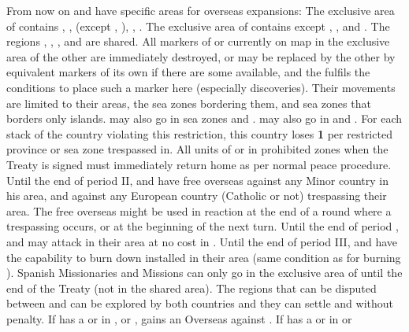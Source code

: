 \effetlong
\aparag From now on \SPA and \POR have specific areas for overseas expansions:
\bparag The exclusive area of \POR contains ,
\continentSiberia, \continentAsia (except \granderegionPhilippines,
), \continentAfrica, \continentBrazil.
\bparag The exclusive area of \SPA contains \continentAmerica except
\continentBrazil, \granderegionAmazonia, and .
\bparag The regions \granderegionAmazonia, ,
\granderegionPhilippines, and  are shared.
\bparag All markers of \SPA or \POR currently on map in the exclusive area of
the other \MAJ are immediately destroyed, or may be replaced by the other \MAJ
by equivalent markers of its own if there are some available, and the \MAJ
fulfils the conditions to place such a marker here (especially discoveries).
\bparag Their movements are limited to their areas, the sea zones bordering
them, and sea zones that borders only islands. \POR may also go in sea zones
 and . \SPA may also go in
 and .
\bparag For each stack of the country violating this restriction, this country
loses {\bf 1} \STAB per restricted province or sea zone trespassed in. All
units of \SPA or \POR in prohibited zones when the Treaty is signed must
immediately return home as per normal peace procedure.
\bparag Until the end of period II, \SPA and \POR have free overseas
 against any Minor country in his area, and against any European
country (Catholic or not) trespassing their area. The free overseas 
might be used in reaction at the end of a round where a trespassing occurs, or
at the beginning of the next turn.
\bparag Until the end of period , \SPA and \POR may attack
 in their area at no cost in \STAB.
\bparag Until the end of period III, \SPA and \POR have the capability to burn
down \COL installed in their area (same condition as for burning \TP).
\bparag Spanish Missionaries and Missions can only go in the exclusive area of
\SPA until the end of the Treaty (not in the shared area).
\bparag The regions that can be disputed between \POR and \SPA can be explored
by both countries and they can settle \COL and \TP without penalty.
\bparag If \POR has a \TP or \COL in \granderegionPhilippines,
\granderegionAmazonia or , \SPA gains an Overseas
\CB against \POR.
\bparag If \SPA has a \TP or \COL in \granderegionPhilippines or
